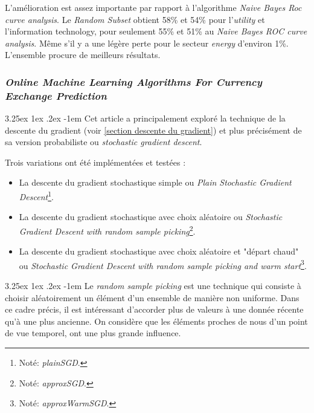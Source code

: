 \documentclass[a4paper, 11pt]{article}
\makeatletter
\newcounter{subsubsubsection}[subsubsection]
\renewcommand\paragraph{\@startsection{paragraph}{5}{\z@}%
  {3.25ex \@plus1ex \@minus.2ex}%
  {-1em}%
  {\normalfont\normalsize\bfseries}}
\makeatother
\begin{document}
L'amélioration est assez importante par rapport à l'algorithme \textit{Naive Bayes Roc curve analysis}. 
Le \textit{Random Subset} obtient 58\% et 54\% pour l'\textit{utility} et l'{information technology}, pour seulement 
55\% et 51\% au \textit{Naive Bayes ROC curve analysis}. Même s'il y a une légère perte pour le secteur 
\textit{energy} d'environ 1\%.
L'ensemble procure de meilleurs résultats.

\subsubsection{\textit{Online Machine Learning Algorithms For Currency Exchange Prediction}}

\paragraph{}
Cet article \cite{descente_du_gradient_stochastique} a principalement exploré la technique de la descente du gradient
(voir \ref{section descente du gradient}) et plus précisément de sa version probabiliste ou
\textit{stochastic gradient descent}.

Trois variations ont été implémentées et testées :
\begin{itemize}
\item La descente du gradient stochastique simple ou \textit{Plain Stochastic Gradient Descent}\footnote{Noté: \textit{plainSGD}.}.
\item La descente du gradient stochastique avec choix aléatoire ou \textit{Stochastic Gradient Descent with random sample picking}\footnote{Noté: \textit{approxSGD}.}.
\item La descente du gradient stochastique avec choix aléatoire et "départ chaud" ou \textit{Stochastic Gradient Descent with random sample picking and warm start}\footnote{Noté: \textit{approxWarmSGD}.}.
\end{itemize}

\paragraph{}
Le \textit{random sample picking} est une technique qui consiste à choisir aléatoirement un élément d'un ensemble
de manière non uniforme. Dans ce cadre précis, il est intéressant d'accorder plus de valeurs à une donnée
récente qu'à une plus ancienne. On considère que les éléments proches de nous d'un point de vue temporel,
ont une plus grande influence.
\end{document}
